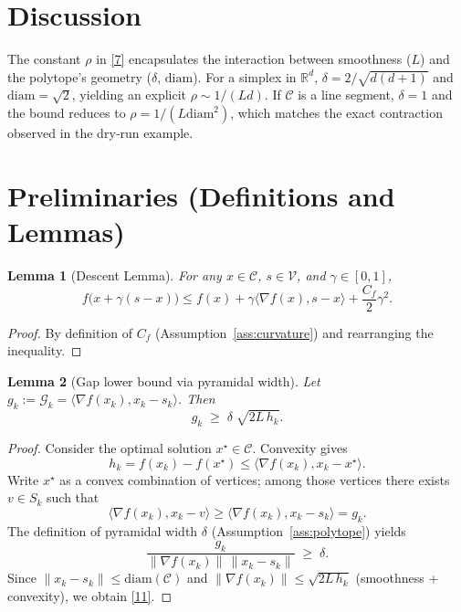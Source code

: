 \documentclass{article}
\newtheorem{lemma}{Lemma}
\newcommand{\R}{\mathbb{R}}
\newcommand{\C}{\mathcal{C}}
\newcommand{\V}{\mathcal{V}}
\newcommand{\gap}{\mathcal{G}}
\newcommand{\diam}{\mathrm{diam}}
\newcommand{\curv}{C_f}
\begin{document}
\section*{Discussion}
The constant $\rho$ in \eqref{7} encapsulates the interaction between smoothness ($L$) and the polytope’s geometry ($\delta$, $\diam$).  
For a simplex in $\R^{d}$, $\delta=2/\sqrt{d(d+1)}$ and $\diam=\sqrt{2}$, yielding an explicit $\rho\sim 1/(Ld)$.  
If $\C$ is a line segment, $\delta=1$ and the bound reduces to $\rho=1/(L\diam^{2})$, which matches the exact contraction observed in the dry‑run example.

\section*{Preliminaries (Definitions and Lemmas)}\label{sec:prelim}
\begin{lemma}[Descent Lemma]\label{lem:descent}
For any $x\in\C$, $s\in\V$, and $\gamma\in[0,1]$,
\[
f\bigl(x+\gamma(s-x)\bigr)\le
f(x)+\gamma\langle\nabla f(x),s-x\rangle+\frac{\curv}{2}\gamma^{2}.
\tag{10}
\]
\end{lemma}
\begin{proof}
By definition of $\curv$ (Assumption~\ref{ass:curvature}) and rearranging the inequality.
\end{proof}

\begin{lemma}[Gap lower bound via pyramidal width]\label{lem:gap}
Let $g_k:=\gap_k=\langle\nabla f(x_k),x_k-s_k\rangle$.
Then
\[
g_k\;\ge\;\delta\;\sqrt{2L\,h_k}.
\tag{11}
\]
\end{lemma}
\begin{proof}
Consider the optimal solution $x^\star\in\C$. Convexity gives
\[
h_k = f(x_k)-f(x^\star)\le\langle\nabla f(x_k),x_k-x^\star\rangle .
\tag{12}
\]
Write $x^\star$ as a convex combination of vertices; among those vertices there exists $v\in S_k$ such that
\[
\langle\nabla f(x_k),x_k-v\rangle\ge
\langle\nabla f(x_k),x_k-s_k\rangle = g_k .
\tag{13}
\]
The definition of pyramidal width $\delta$ (Assumption~\ref{ass:polytope}) yields
\[
\frac{g_k}{\|\nabla f(x_k)\|\,\|x_k-s_k\|}
\;\ge\;\delta .
\tag{14}
\]
Since $\|x_k-s_k\|\le\diam(\C)$ and $\|\nabla f(x_k)\|\le\sqrt{2L\,h_k}$ (smoothness + convexity), we obtain \eqref{11}.
\end{proof}
\end{document}
